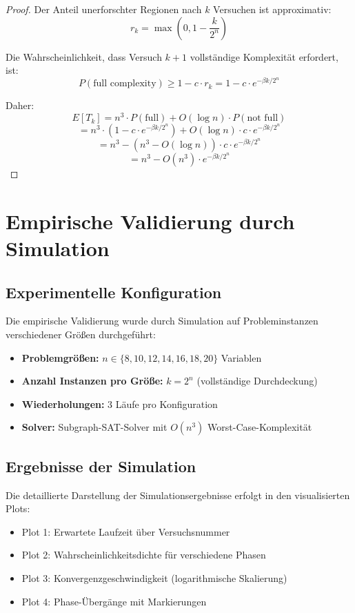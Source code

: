 ﻿\documentclass[a4paper,12pt]{article}
\theoremstyle{definition}
\begin{document}
\begin{proof}
Der Anteil unerforschter Regionen nach $k$ Versuchen ist approximativ:
\[
r_k = \max\left(0, 1 - \frac{k}{2^n}\right)
\]

Die Wahrscheinlichkeit, dass Versuch $k+1$ vollständige Komplexität erfordert, ist:
\[
P(\text{full complexity}) \geq 1 - c \cdot r_k = 1 - c \cdot e^{-\beta k / 2^n}
\]

Daher:
\[
E[T_k] = n^3 \cdot P(\text{full}) + O(\log n) \cdot P(\text{not full})
\]
\[
= n^3 \cdot (1 - c \cdot e^{-\beta k / 2^n}) + O(\log n) \cdot c \cdot e^{-\beta k / 2^n}
\]
\[
= n^3 - (n^3 - O(\log n)) \cdot c \cdot e^{-\beta k / 2^n}
\]
\[
= n^3 - O(n^3) \cdot e^{-\beta k / 2^n}
\]
\end{proof}

\section{Empirische Validierung durch Simulation}

\subsection{Experimentelle Konfiguration}

Die empirische Validierung wurde durch Simulation auf Probleminstanzen verschiedener Größen durchgeführt:

\begin{itemize}
	\item \textbf{Problemgrößen:} $n \in \{8, 10, 12, 14, 16, 18, 20\}$ Variablen
	\item \textbf{Anzahl Instanzen pro Größe:} $k = 2^n$ (vollständige Durchdeckung)
	\item \textbf{Wiederholungen:} 3 Läufe pro Konfiguration
	\item \textbf{Solver:} Subgraph-SAT-Solver mit $O(n^3)$ Worst-Case-Komplexität
\end{itemize}

\subsection{Ergebnisse der Simulation}

Die detaillierte Darstellung der Simulationsergebnisse erfolgt in den visualisierten Plots:
\begin{itemize}
	\item Plot 1: Erwartete Laufzeit über Versuchsnummer
	\item Plot 2: Wahrscheinlichkeitsdichte für verschiedene Phasen
	\item Plot 3: Konvergenzgeschwindigkeit (logarithmische Skalierung)
	\item Plot 4: Phase-Übergänge mit Markierungen
\end{itemize}
\end{document}
